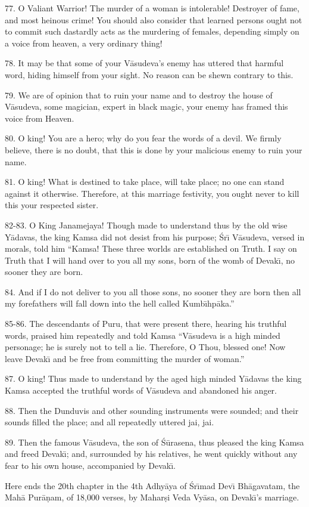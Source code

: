 77. O Valiant Warrior! The murder of a woman is intolerable! Destroyer of fame, and most heinous crime! You should also consider that learned persons ought not to commit such dastardly acts as the murdering of females, depending simply on a voice from heaven, a very ordinary thing!

78. It may be that some of your V\=asudeva's enemy has uttered that harmful word, hiding himself from your sight. No reason can be shewn contrary to this.

79. We are of opinion that to ruin your name and to destroy the house of V\=asudeva, some magician, expert in black magic, your enemy has framed this voice from Heaven.

80. O king! You are a hero; why do you fear the words of a devil. We firmly believe, there is no doubt, that this is done by your malicious enemy to ruin your name.

81. O king! What is destined to take place, will take place; no one can stand against it otherwise. Therefore, at this marriage festivity, you ought never to kill this your respected sister.

82-83. O King Janamejaya! Though made to understand thus by the old wise Y\=adavas, the king Kamsa did not desist from his purpose; \'Sr\={\i} V\=asudeva, versed in morals, told him ``Kamsa! These three worlds are established on Truth. I say on Truth that I will hand over to you all my sons, born of the womb of Devak\={\i}, no sooner they are born.

84. And if I do not deliver to you all those sons, no sooner they are born then all my forefathers will fall down into the hell called Kumb\={\i}hp\=aka.''

85-86. The descendants of Puru, that were present there, hearing his truthful words, praised him repeatedly and told Kamsa ``V\=asudeva is a high minded personage; he is surely not to tell a lie. Therefore, O Thou, blessed one! Now leave Devak\={\i} and be free from committing the murder of woman.''

87. O king! Thus made to understand by the aged high minded Y\=adavas the king Kamsa accepted the truthful words of V\=asudeva and abandoned his anger.

88. Then the Dunduvis and other sounding instruments were sounded; and their sounds filled the place; and all repeatedly uttered jai, jai.

89. Then the famous V\=asudeva, the son of \'S\=urasena, thus pleased the king Kamsa and freed Devak\={\i}; and, surrounded by his relatives, he went quickly without any fear to his own house, accompanied by Devak\={\i}.

Here ends the 20th chapter in the 4th Adhy\=aya of \'Sr\={\i}mad Dev\={\i} Bh\=agavatam, the Mah\=a Pur\=a\d{n}am, of 18,000 verses, by Mahar\d{s}i Veda Vy\=asa, on Devak\={\i}'s marriage.



